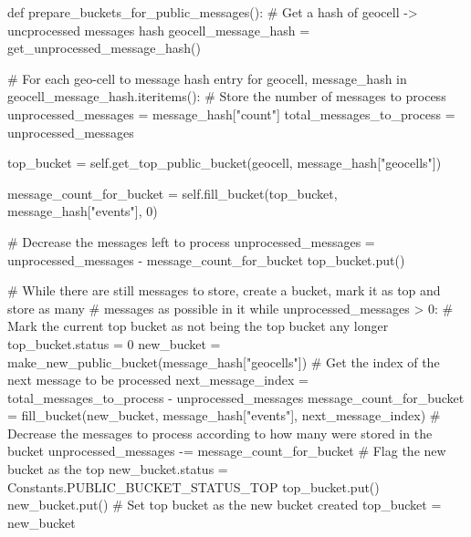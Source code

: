\documentclass{article}
\begin{document}
\begin{center}
\begin{minipage}{5.5in}%
\begin{python}[caption={Bucket Preparation Algorithm in Python},label={code:ec_GA}] 

def	prepare_buckets_for_public_messages():
  # Get a hash of geocell -> uncprocessed messages hash
  geocell_message_hash = get_unprocessed_message_hash()

  # For each geo-cell to message hash entry
  for geocell, message_hash in geocell_message_hash.iteritems():
  # Store the number of messages to process
    unprocessed_messages = message_hash["count"]
    total_messages_to_process = unprocessed_messages

    top_bucket = self.get_top_public_bucket(geocell, message_hash["geocells"])

	message_count_for_bucket = self.fill_bucket(top_bucket, message_hash["events"], 0)

	# Decrease the messages left to process
	unprocessed_messages = unprocessed_messages - message_count_for_bucket
	top_bucket.put()

	# While there are still messages to store, create a bucket, mark it as top and store as many
	# messages as possible in it   
    while unprocessed_messages > 0:
	  # Mark the current top bucket as not being the top bucket any longer
	  top_bucket.status = 0
	  new_bucket = make_new_public_bucket(message_hash["geocells"])
	  # Get the index of the next message to be processed
	  next_message_index = total_messages_to_process - unprocessed_messages
	  message_count_for_bucket = fill_bucket(new_bucket, message_hash["events"], next_message_index)
	  # Decrease the messages to process according to how many were stored in the bucket
	  unprocessed_messages -= message_count_for_bucket
	  # Flag the new bucket as the top
	  new_bucket.status = Constants.PUBLIC_BUCKET_STATUS_TOP
	  top_bucket.put()
	  new_bucket.put()
	  # Set top bucket as the new bucket created
	  top_bucket = new_bucket
\end{python}
\end{minipage}
\end{center}



\end{document}
